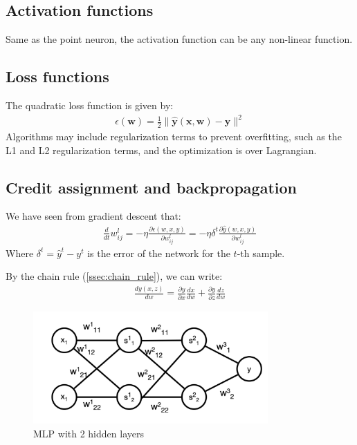 \documentclass[11pt]{book} %
\begin{document}
\subsection{Activation functions}
Same as the point neuron, the activation function can be any non-linear function.

\subsection{Loss functions}
The quadratic loss function is given by:
\begin{align*}
    \epsilon(\mathbf{w}) = \frac{1}{2} \lVert \hat{\mathbf{y}}(\mathbf{x}, \mathbf{w}) - \mathbf{y} \rVert^2
\end{align*}
Algorithms may include regularization terms to prevent overfitting, such as the L1 and L2 regularization terms, and the optimization is over Lagrangian.

%
%

\subsection{Credit assignment and backpropagation}

We have seen from gradient descent that: 
\begin{align*}
    \frac{d}{dt} w_{ij}^l = - \eta \frac{\partial \epsilon (w, x, y)}{\partial w_{ij}^l} = - \eta \delta^t \frac{\partial \hat{y}(w, x, y)}{\partial w_{ij}^l}
\end{align*}
Where $\delta^t = \hat{y}^t - y^t$ is the error of the network for the $t$-th sample.

By the chain rule (\ref{ssec:chain_rule}), we can write:
\begin{align*}
    \frac{dy(x,z)}{dw} = \frac{\partial y}{\partial x} \frac{dx}{dw} + \frac{\partial y}{\partial z} \frac{dz}{dw}
\end{align*}

\begin{figure}
    \centering
    \includegraphics[width=0.8\textwidth]{Figs/backprop.jpeg}
    \caption{MLP with 2 hidden layers}
    \label{fig:backpropagation}
\end{figure}
\end{document}
